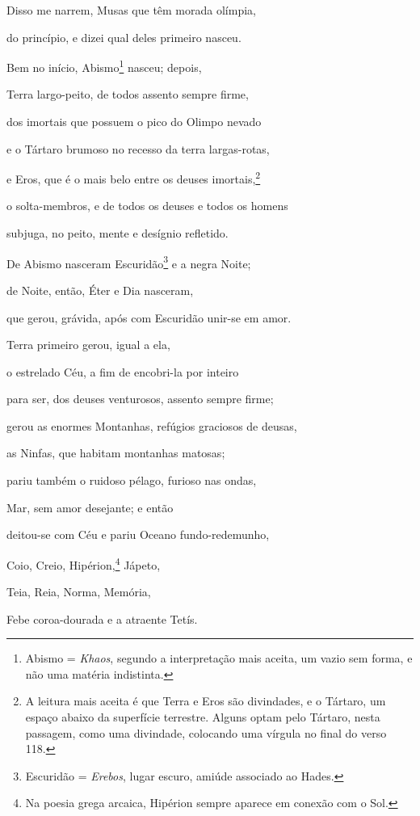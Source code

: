 \begin{pages}
\begin{Rightside}
Disso me narrem, Musas que têm morada olímpia,

do princípio, e dizei qual deles primeiro nasceu. 

\quad{}Bem no início, Abismo\footnote{Abismo = \emph{Khaos}, segundo a interpretação mais aceita, um
vazio sem forma, e não uma matéria indistinta.} nasceu; depois,

Terra largo-peito, de todos assento sempre firme,

dos imortais que possuem o pico do Olimpo nevado

e o Tártaro brumoso no recesso da terra largas-rotas,

e Eros, que é o mais belo entre os deuses imortais,\footnote{A leitura mais aceita é que Terra e Eros são divindades, e o
Tártaro, um espaço abaixo da superfície terrestre. Alguns optam pelo
Tártaro, nesta passagem, como uma divindade, colocando uma vírgula no
final do verso 118.} 

o solta-membros, e de todos os deuses e todos os homens

subjuga, no peito, mente e desígnio refletido.

\medskip

De Abismo nasceram Escuridão\footnote{Escuridão = \emph{Erebos}, lugar escuro, amiúde associado ao Hades.} e a negra Noite;

de Noite, então, Éter e Dia nasceram,

que gerou, grávida, após com Escuridão unir-se em amor. 

\medskip

Terra primeiro gerou, igual a ela,

o estrelado Céu, a fim de encobri-la por inteiro

para ser, dos deuses venturosos, assento sempre firme;

gerou as enormes Montanhas, refúgios graciosos de deusas,

as Ninfas, que habitam montanhas matosas; 

pariu também o ruidoso pélago, furioso nas ondas,

Mar, sem amor desejante; e então

deitou-se com Céu e pariu Oceano fundo-redemunho,

Coio, Creio, Hipérion,\footnote{Na poesia grega arcaica, Hipérion sempre aparece em conexão com o
Sol.} Jápeto,

Teia, Reia, Norma, Memória, 

Febe coroa-dourada e a atraente Tetís.


\end{Rightside}
\end{pages}
